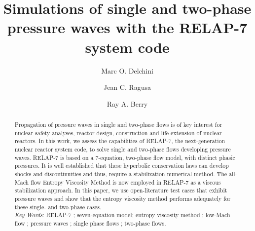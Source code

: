 \documentclass{inputs/mc2015}
\begin{document}
\title{Simulations of single and two-phase pressure waves with the RELAP-7 system code}

\author{Marc O. Delchini}
\author{Jean C. Ragusa}

\author{Ray A. Berry}

\maketitle

\begin{abstract}


Propagation of pressure waves in single and two-phase flows is of key interest for nuclear safety analyses, reactor design, construction and life extension of nuclear reactors. In this work, we assess the capabilities of RELAP-7, the next-generation nuclear reactor system code, to solve single and two-phase flows developing pressure waves. RELAP-7 is based on a 7-equation, two-phase flow model, with distinct phasic pressures. It is well established that these hyperbolic conservation laws can develop shocks and discontinuities and thus, require a stabilization 
numerical method. The all-Mach flow Entropy Viscosity Method is now employed in RELAP-7 as a viscous stabilization approach. 
In this paper, we use open-literature test cases that exhibit pressure waves and show that the entropy viscosity method performs adequately for these single- and two-phase cases. \\
%
\emph{Key Words}:  RELAP-7 ; seven-equation model; entropy viscosity method ; low-Mach flow ; pressure waves ; single phase flows ; two-phase flows.
\end{abstract}
\end{document}
